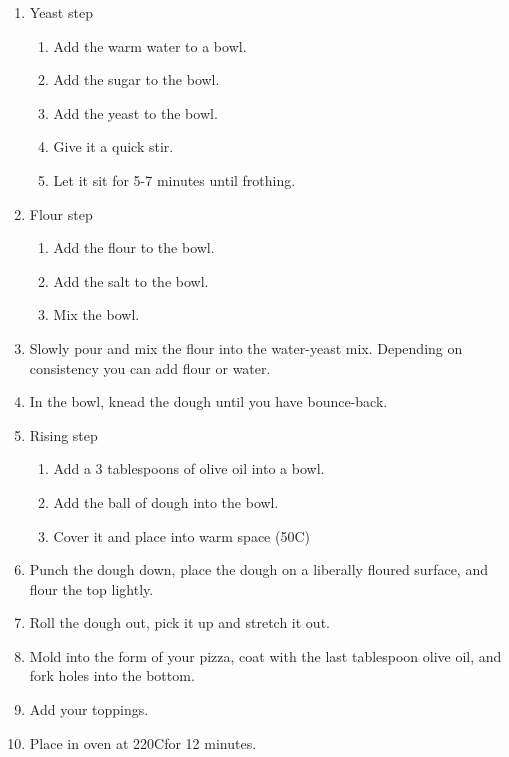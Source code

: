 \documentclass{article}
\begin{document}
\begin{enumerate}
    \item Yeast step
        \begin{enumerate}
            \item Add the warm water to a bowl.
            \item Add the sugar to the bowl.
            \item Add the yeast to the bowl.
            \item Give it a quick stir.
            \item Let it sit for 5-7 minutes until frothing.
        \end{enumerate}
    \item Flour step
        \begin{enumerate}
            \item Add the flour to the bowl.
            \item Add the salt to the bowl.
            \item Mix the bowl.
        \end{enumerate}
    \item Slowly pour and mix the flour into the water-yeast mix. Depending on consistency you can add flour or water.
    \item In the bowl, knead the dough until you have bounce-back.
    \item Rising step
        \begin{enumerate}
            \item Add a 3 tablespoons of olive oil into a bowl.
            \item Add the ball of dough into the bowl.
            \item Cover it and place into warm space (50C\textdegree)
        \end{enumerate}
    \item Punch the dough down, place the dough on a liberally floured surface, and flour the top lightly.
    \item Roll the dough out, pick it up and stretch it out.
    \item Mold into the form of your pizza, coat with the last tablespoon olive oil, and fork holes into the bottom.
    \item Add your toppings.
    \item Place in oven at 220C\textdegree for 12 minutes.
\end{enumerate}
\end{document}
